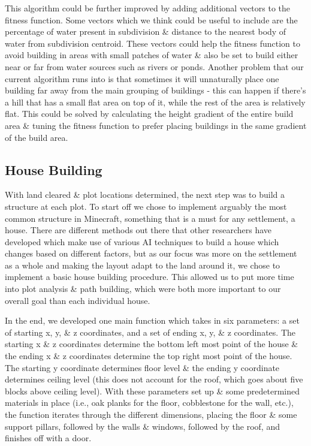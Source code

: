 \documentclass[11pt, oneside]{article}
\begin{document}
\begin{normalsize}
This algorithm could be further improved by adding additional vectors to the fitness function. Some vectors which we think could be useful to include are the percentage of water present in subdivision \& distance to the nearest body of water from subdivision centroid. These vectors could help the fitness function to avoid building in areas with small patches of water \& also be set to build either near or far from water sources such as rivers or ponds. Another problem that our current algorithm runs into is that sometimes it will unnaturally place one building far away from the main grouping of buildings - this can happen if there's a hill that has a small flat area on top of it, while the rest of the area is relatively flat. This could be solved by calculating the height gradient of the entire build area \& tuning the fitness function to prefer placing buildings in the same gradient of the build area.

\subsection{House Building}

With land cleared \& plot locations determined, the next step was to build a structure at each plot. 
To start off we chose to implement arguably the most common structure in Minecraft, something that is a must for any settlement, a house. 
There are different methods out there that other researchers have developed which make use of various AI techniques to build a house which changes based on different factors, but as our focus was more on the settlement as a whole and making the layout adapt to the land around it, we chose to implement a basic house building procedure. 
This allowed us to put more time into plot analysis \& path building, which were both more important to our overall goal than each individual house. 

In the end, we developed one main function which takes in six parameters: a set of starting x, y, \& z coordinates, and a set of ending x, y, \& z coordinates. 
The starting x \& z coordinates determine the bottom left most point of the house \& the ending x \& z coordinates determine the top right most point of the house. 
The starting y coordinate determines floor level \& the ending y coordinate determines ceiling level (this does not account for the roof, which goes about five blocks above ceiling level).
With these parameters set up \& some predetermined materials in place (i.e., oak planks for the floor, cobblestone for the wall, etc.), the function iterates through the different dimensions, placing the floor \& some support pillars, followed by the walls \& windows, followed by the roof, and finishes off with a door. 


\end{normalsize}
\end{document}
